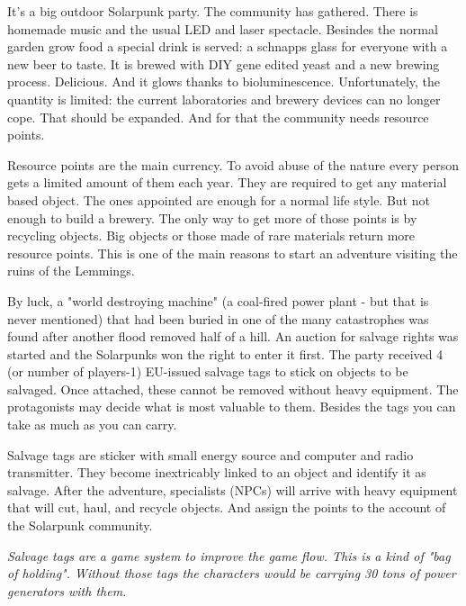It's a big outdoor Solarpunk party. The community has gathered. There is homemade music and the usual LED and laser spectacle. Besindes the normal garden grow food a special drink is served: a schnapps glass for everyone with a new beer to taste.
It is brewed with DIY gene edited yeast and a new brewing process. Delicious. And it glows thanks to bioluminescence. Unfortunately, the quantity is limited: the current laboratories and brewery devices can no longer cope. That should be expanded. And for that the community needs resource points.

\begin{sidebarBox}[title=Resource points]
Resource points are the main currency. To avoid abuse of the nature every person gets a limited amount of them each year. They are required to get any material based object. The ones appointed are enough for a normal life style. But not enough to build a brewery. The only way to get more of those points is by recycling objects. Big objects or those made of rare materials return more resource points. This is one of the main reasons to start an adventure visiting the ruins of the Lemmings. 
\end{sidebarBox}

By luck, a "world destroying machine" (a coal-fired power plant - but that is never mentioned) that had been buried in one of the many catastrophes was found after another flood removed half of a hill. An auction for salvage rights was started and the Solarpunks won the right to enter it first.
The party received 4 (or number of players-1) EU-issued salvage tags to stick on objects to be salvaged. Once attached, these cannot be removed without heavy equipment. The protagonists may decide what is most valuable to them. Besides the tags you can take as much as you can carry.

\begin{sidebarBox}[title=Resource points]
Salvage tags are sticker with small energy source and computer and radio transmitter. They become inextricably linked to an object and identify it as salvage. After the adventure, specialists (NPCs) will arrive with heavy equipment that will cut, haul, and recycle objects. And assign the points to the account of the Solarpunk community.
\end{sidebarBox}

\emph{Salvage tags are a game system to improve the game flow. This is a kind of "bag of holding". Without those tags the characters would be carrying 30 tons of power generators with them.}

